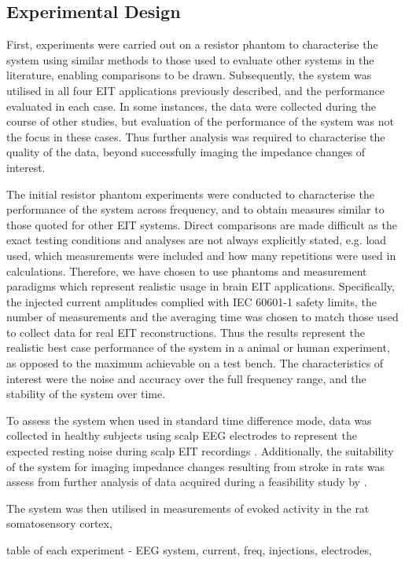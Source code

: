 \subsection{Experimental Design}

First, experiments were carried out on a resistor phantom to characterise the system using similar methods to those used to evaluate other systems in the literature, enabling comparisons to be drawn. Subsequently, the system was utilised in all four EIT applications previously described, and the performance evaluated in each case. In some instances, the data were collected during the course of other studies, but evaluation of the performance of the system was not the focus in these cases. Thus further analysis was required to characterise the quality of the data, beyond successfully imaging the impedance changes of interest. 

The initial resistor phantom experiments were conducted to characterise the performance of the system across frequency, and to obtain measures similar to those quoted for other EIT systems. Direct comparisons are made difficult as the exact testing conditions and analyses are not always explicitly stated, e.g. load used, which measurements were included and how many repetitions were used in calculations. Therefore, we have chosen to use phantoms and measurement paradigms which represent realistic usage in brain EIT applications. Specifically, the injected current amplitudes complied with IEC 60601-1 \cite{IEC} safety limits, the number of measurements and the averaging time was chosen to match those used to collect data for real EIT reconstructions. Thus the results represent the realistic best case performance of the system  in a animal or human experiment, as opposed to the maximum achievable on a test bench. The characteristics of interest were the noise and accuracy over the full frequency range, and the stability of the system over time.

To assess the system when used in standard time difference mode, data was collected in healthy subjects using scalp EEG electrodes to represent the expected resting noise during scalp EIT recordings  \cite{Fabrizi_2006,fabrizi2007analysis,Romsauerova2006}. Additionally, the suitability of the system for imaging impedance changes resulting from stroke in rats was assess from further analysis of data acquired during a feasibility study by \citet{Dowrick_2016}. 

The system was then utilised in measurements of evoked activity in the rat somatosensory cortex, 



table of each experiment - EEG system, current, freq, injections, electrodes, 

